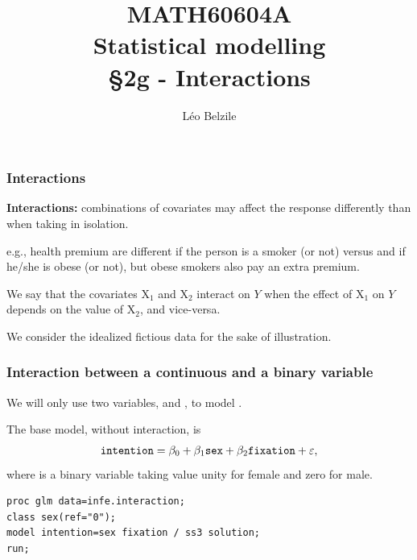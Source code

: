 \documentclass{beamer}
\title[\color{white}{MATH60604A Interactions}]{\texorpdfstring{MATH60604A \\Statistical modelling \\ \S 2g - Interactions}{MATH60604A \\Statistical modelling \\ \S~2g - Interactions}}
\author{Léo Belzile}
\institute{HEC Montréal\\
Department of Decision Sciences}
\date{}
\begin{document}
\frame{\titlepage}

\begin{frame}
 \frametitle{Interactions}
 \bi 
 \item \textbf{Interactions:} combinations of covariates may affect the response differently than  when taking in isolation.
 \item e.g., health premium are different if the person is a smoker (or not) versus and if he/she is obese (or not), but obese smokers also pay an extra premium.
\item We say that the covariates $\mathrm{X}_1$ and $\mathrm{X}_2$ interact on $Y$ when \alert{the effect of $\mathrm{X}_1$ on $Y$ depends on the value of $\mathrm{X}_2$, and vice-versa}.
  \item We consider the idealized fictious data  for the sake of illustration.
  \ei
 \end{frame}
 
\begin{frame}[fragile]
\frametitle{Interaction between a continuous and a binary variable}
\bi
\item We will only use two variables,  and , to model . 
\item The base model, without interaction, is
\begin{align*}
\texttt{intention}=\beta_0 + \beta_1 \texttt{sex} + \beta_2 \texttt{fixation} + \varepsilon,
\end{align*}
where  is a binary variable taking value unity for female and zero for male.
\ei
\begin{tcolorbox}[colback=white,colframe=hecblue,title=\SASlang code to fit a linear model]
\begin{verbatim}
proc glm data=infe.interaction;
class sex(ref="0");
model intention=sex fixation / ss3 solution;
run;
\end{verbatim}
\end{tcolorbox}
\end{frame}
\end{document}
